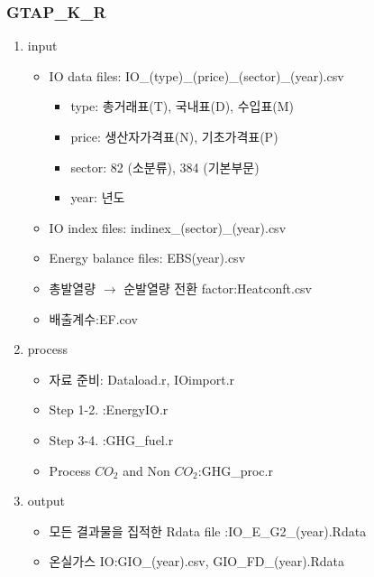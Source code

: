 \documentclass[10pt,compress,slidetop,%
			   hyperref={unicode},xcolor={svgnames},%
			   t]{beamer}
\begin{document}
\begin{frame}
	\frametitle{GTAP\_K\_R}
\begin{enumerate}
\item{input}
	\begin{itemize}
\item{IO data files: IO\_(type)\_(price)\_(sector)\_(year).csv}
	\begin{itemize}
	\item{type: 총거래표(T), 국내표(D), 수입표(M)}
	\item{price: 생산자가격표(N), 기초가격표(P)}
	\item{sector: 82 (소분류), 384 (기본부문)}
	\item{year: 년도}
	\end{itemize}
\item{IO index files: indinex\_(sector)\_(year).csv}
	\item{Energy balance files: EBS(year).csv}
	\item{총발열량 $\rightarrow$ 순발열량 전환 factor:Heatconft.csv}
	\item{배출계수:EF.cov}
	\end{itemize}
\item{process}
	\begin{itemize}
	\item{자료 준비: Dataload.r, IOimport.r}
	\item{Step 1-2. :EnergyIO.r}
	\item{Step 3-4. :GHG\_fuel.r}
	\item{Process $CO_2$ and Non $CO_2$:GHG\_proc.r}
	\end{itemize}		

\item{output}
\begin{itemize}
\item{모든 결과물을 집적한 Rdata file :IO\_E\_G2\_(year).Rdata}
\item{온실가스 IO:GIO\_(year).csv, GIO\_FD\_(year).Rdata}
\end{itemize}		

\end{enumerate}	
\end{frame}
\end{document}
